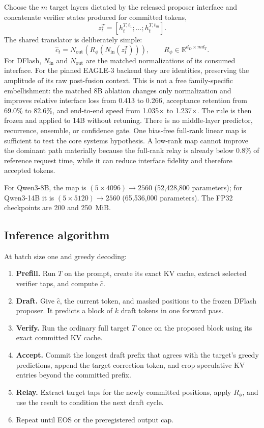 \documentclass[10pt]{article}
\begin{document}
Choose the $m$ target layers dictated by the released proposer interface and
concatenate verifier states produced for committed tokens,
\begin{equation}
z_t^T=[h_t^{T,t_1};\ldots;h_t^{T,t_m}].
\end{equation}
The shared translator is deliberately simple:
\begin{equation}
\widehat c_t = N_{\mathrm{out}}\!\left(
R_\phi(N_{\mathrm{in}}(z_t^T))\right),
\qquad R_\phi\in\mathbb{R}^{d_D\times m d_T}.
\end{equation}
For DFlash, $N_{\mathrm{in}}$ and $N_{\mathrm{out}}$ are the matched
normalizations of its consumed interface. For the pinned EAGLE-3 backend they
are identities, preserving the amplitude of its raw post-fusion context. This
is not a free family-specific embellishment: the matched 8B ablation changes
only normalization and improves relative interface loss from 0.413 to 0.266,
acceptance retention from 69.0\% to 82.6\%, and end-to-end speed from
1.035$\times$ to 1.237$\times$. The rule is then frozen and applied to 14B
without retuning.
There is no middle-layer predictor, recurrence, ensemble, or confidence gate.
One bias-free full-rank linear map is sufficient to test the core systems
hypothesis. A low-rank map cannot improve the dominant path materially because
the full-rank relay is already below 0.8\% of reference request time, while it
can reduce interface fidelity and therefore accepted tokens.

For Qwen3-8B, the map is $(5\times4096)\rightarrow2560$ (52,428,800
parameters); for Qwen3-14B it is $(5\times5120)\rightarrow2560$
(65,536,000 parameters). The FP32 checkpoints are 200 and 250~MiB.

\subsection{Inference algorithm}

At batch size one and greedy decoding:

\begin{enumerate}
  \item \textbf{Prefill.} Run $T$ on the prompt, create its exact KV cache,
        extract selected verifier taps, and compute $\widehat c$.
  \item \textbf{Draft.} Give $\widehat c$, the current token, and masked
        positions to the frozen DFlash proposer. It predicts a block of $k$
        draft tokens in one forward pass.
  \item \textbf{Verify.} Run the ordinary full target $T$ once on the proposed
        block using its exact committed KV cache.
  \item \textbf{Accept.} Commit the longest draft prefix that agrees with the
        target's greedy predictions, append the target correction token, and
        crop speculative KV entries beyond the committed prefix.
  \item \textbf{Relay.} Extract target taps for the newly committed positions,
        apply $R_\phi$, and use the result to condition the next draft cycle.
  \item Repeat until EOS or the preregistered output cap.
\end{enumerate}
\end{document}
